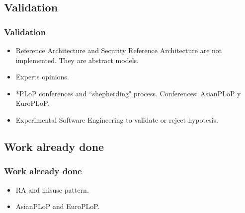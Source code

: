 \documentclass[serif,9pt]{beamer}
\begin{document}
\subsection{Validation}
\begin{frame}
	\frametitle{Validation}	
	\begin{itemize}
	\item<1> Reference Architecture and Security Reference Architecture are not implemented. They are abstract models.
	\item<1> Experts opinions.
	\item<2> *PLoP conferences and ``shepherding" process. Conferences: AsianPLoP y EuroPLoP.
	\item<2> Experimental Software Engineering to validate or reject hypotesis. 
	\end{itemize}
\end{frame}

\subsection{Work already done}
\begin{frame}
	\frametitle{Work already done}
	\begin{itemize}
		\item RA and misuse pattern.
		\item AsianPLoP and EuroPLoP.
	\end{itemize}
\end{frame}
\end{document}
